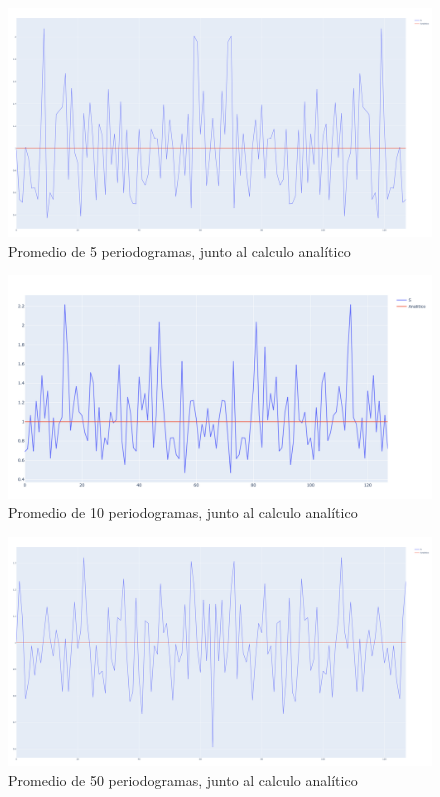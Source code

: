 \documentclass[12pt,letterpaper]{article}     %
\begin{document}
\begin{figure}[!ht]
\centering
\includegraphics[width=18cm]{imagenes/PromedioN5.png}
\caption{Promedio de 5 periodogramas, junto al calculo analítico}
\end{figure}

\begin{figure}[!ht]
\centering
\includegraphics[width=18cm]{imagenes/PromedioN10.png}
\caption{Promedio de 10 periodogramas, junto al calculo analítico}
\end{figure}

\begin{figure}[!ht]
\centering
\includegraphics[width=18cm]{imagenes/PromedioN50.png}
\caption{Promedio de 50 periodogramas, junto al calculo analítico}
\end{figure}
\end{document}
